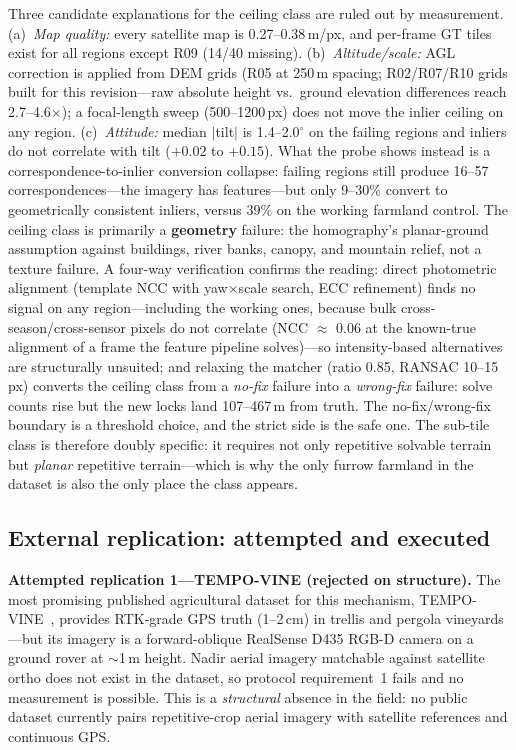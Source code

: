 \documentclass[journal]{IEEEtran}
\begin{document}
Three candidate explanations for the ceiling class are ruled out by measurement. (a)~\emph{Map quality:} every satellite map is 0.27--0.38\,m/px, and per-frame GT tiles exist for all regions except R09 (14/40 missing). (b)~\emph{Altitude/scale:} AGL correction is applied from DEM grids (R05 at 250\,m spacing; R02/R07/R10 grids built for this revision---raw absolute height vs.\ ground elevation differences reach 2.7--4.6$\times$); a focal-length sweep (500--1200\,px) does not move the inlier ceiling on any region. (c)~\emph{Attitude:} median $|$tilt$|$ is 1.4--2.0$^{\circ}$ on the failing regions and inliers do not correlate with tilt ($+0.02$ to $+0.15$). What the probe shows instead is a correspondence-to-inlier conversion collapse: failing regions still produce 16--57 correspondences---the imagery has features---but only 9--30\% convert to geometrically consistent inliers, versus 39\% on the working farmland control. The ceiling class is primarily a \textbf{geometry} failure: the homography's planar-ground assumption against buildings, river banks, canopy, and mountain relief, not a texture failure. A four-way verification confirms the reading: direct photometric alignment (template NCC with yaw$\times$scale search, ECC refinement) finds no signal on any region---including the working ones, because bulk cross-season/cross-sensor pixels do not correlate (NCC $\approx$ 0.06 at the known-true alignment of a frame the feature pipeline solves)---so intensity-based alternatives are structurally unsuited; and relaxing the matcher (ratio 0.85, RANSAC 10--15\,px) converts the ceiling class from a \emph{no-fix} failure into a \emph{wrong-fix} failure: solve counts rise but the new locks land 107--467\,m from truth. The no-fix/wrong-fix boundary is a threshold choice, and the strict side is the safe one. The sub-tile class is therefore doubly specific: it requires not only repetitive solvable terrain but \emph{planar} repetitive terrain---which is why the only furrow farmland in the dataset is also the only place the class appears.

\subsection{External replication: attempted and executed}
\label{sec:replication}

\textbf{Attempted replication 1---TEMPO-VINE (rejected on structure).} The most promising published agricultural dataset for this mechanism, TEMPO-VINE~\cite{tempovine}, provides RTK-grade GPS truth (1--2\,cm) in trellis and pergola vineyards---but its imagery is a forward-oblique RealSense D435 RGB-D camera on a ground rover at $\sim$1\,m height. Nadir aerial imagery matchable against satellite ortho does not exist in the dataset, so protocol requirement~1 fails and no measurement is possible. This is a \emph{structural} absence in the field: no public dataset currently pairs repetitive-crop aerial imagery with satellite references and continuous GPS.
\end{document}
